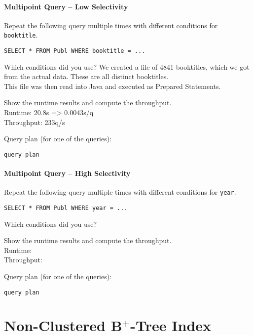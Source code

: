 \documentclass[11pt]{scrartcl}
\begin{document}
\paragraph{Multipoint Query -- Low Selectivity}

Repeat the following query multiple times with different conditions for {\tt booktitle}.

{\small
\begin{verbatim}
SELECT * FROM Publ WHERE booktitle = ...
\end{verbatim}
}

\noindent
Which conditions did you use?
We created a file of 4841 booktitles, which we got from the actual data. These are all distinct booktitles.\\
This file was then read into Java and executed as Prepared Statements.

\smallskip\noindent
Show the runtime results and compute the throughput.\\
Runtime: 20.8s => 0.0043s/q\\
Throughput: 233q/s

\smallskip\noindent
Query plan (for one of the queries):
{\small
\begin{verbatim}
query plan
\end{verbatim}
}


\paragraph{Multipoint Query -- High Selectivity}

Repeat the following query multiple times with different conditions for {\tt year}.

{\small
\begin{verbatim}
SELECT * FROM Publ WHERE year = ...
\end{verbatim}
}

\noindent
Which conditions did you use?

\smallskip\noindent
Show the runtime results and compute the throughput.\\
Runtime: \\
Throughput: 

\smallskip\noindent
Query plan (for one of the queries):
{\small
\begin{verbatim}
query plan
\end{verbatim}
}

\section{Non-Clustered B$^+$-Tree Index}
\end{document}
